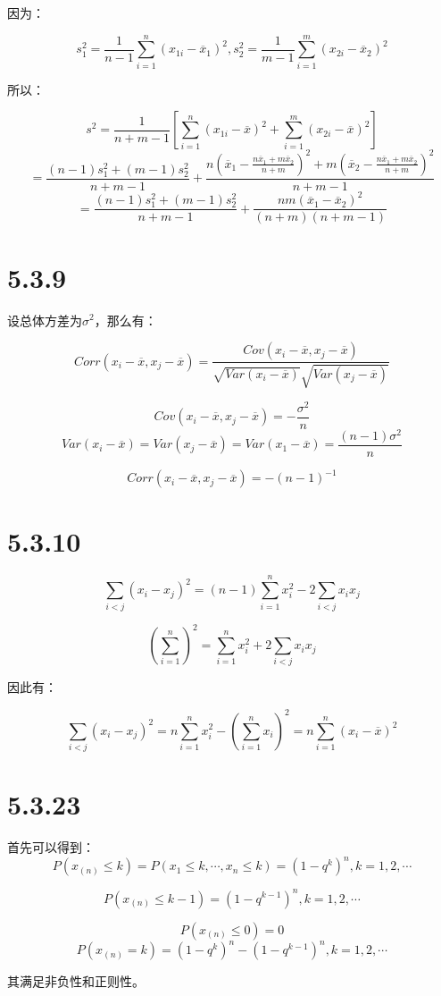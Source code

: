 \documentclass{article}
\begin{document}
因为：

$$s_1^2=\frac1{n-1}\sum^n_{i=1}(x_{1i}-\overline x_1)^2,s_2^2=\frac1{m-1}\sum^m_{i=1}(x_{2i}-\overline x_2)^2$$

所以：

$$s^2=\frac{1}{n+m-1}[\sum^n_{i=1}(x_{1i}-\overline x)^2+\sum^m_{i=1}(x_{2i}-\overline x)^2]$$
$$=\frac{(n-1)s_1^2+(m-1)s_2^2}{n+m-1}+\frac{n(\overline x_1-\frac{n\overline x_1+m\overline x_2}{n+m})^2+m(\overline x_2-\frac{n\overline x_1+m\overline x_2}{n+m})^2}{n+m-1}$$
$$=\frac{(n-1)s_1^2+(m-1)s_2^2}{n+m-1}+\frac{nm(\overline x_1 - \overline x_2)^2}{(n+m)(n+m-1)}$$

\section{5.3.9}
设总体方差为$\sigma^2$，那么有：

$$Corr(x_i-\overline x,x_j-\overline x)=\frac{Cov(x_i-\overline x, x_j-\overline x)}{\sqrt{Var(x_i-\overline x)}\sqrt{Var(x_j-\overline x)}}$$

$$Cov(x_i-\overline x, x_j-\overline x)=-\frac{\sigma^2}{n}$$
$$Var(x_i-\overline x)=Var(x_j - \overline x)=Var(x_1 - \overline x)=\frac{(n-1)\sigma^2}{n}$$

$$Corr(x_i-\overline x,x_j-\overline x)=-(n-1)^{-1}$$

\section{5.3.10}


$$\sum_{i<j}(x_i-x_j)^2=(n-1)\sum^n_{i=1}x^2_i-2\sum_{i<j}x_ix_j$$

$$(\sum^n_{i=1})^2=\sum^n_{i=1}x^2_i+2\sum_{i<j}x_ix_j$$

因此有：

$$\sum_{i<j}(x_i-x_j)^2=n\sum^n_{i=1}x_i^2-(\sum^n_{i=1}x_i)^2=n\sum^n_{i=1}(x_i-\overline x)^2$$


\section{5.3.23}

首先可以得到：
$$P(x_{(n)}\leq k)=P(x_1\leq k,\cdots,x_n\leq k)=(1-q^{k})^n, k=1,2,\cdots$$

$$P(x_{(n)}\leq k-1)=(1-q^{k-1})^n, k=1,2,\cdots$$


$$P(x_{(n)}\leq 0)=0$$
$$P(x_{(n)}= k)=(1-q^{k})^n-(1-q^{k-1})^n, k=1,2,\cdots$$

其满足非负性和正则性。
\end{document}

